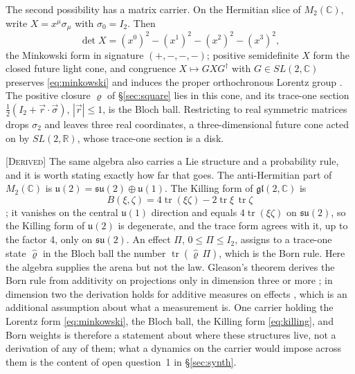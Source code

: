 \documentclass[11pt]{article}
\theoremstyle{boldplain}
\theoremstyle{boldupright}
\newcommand{\derived}{[\textup{\textsc{Derived}}]}
\newcommand{\tr}{\operatorname{tr}}
\begin{document}
The second possibility has a matrix carrier. On the Hermitian slice of $M_2(\mathbb{C})$, write $X=x^\mu\sigma_\mu$
with $\sigma_0=I_2$. Then
\begin{equation}\label{eq:minkowski}
\det X=(x^0)^2-(x^1)^2-(x^2)^2-(x^3)^2,
\end{equation}
the Minkowski form in signature $(+,-,-,-)$; positive semidefinite $X$ form the closed future light
cone, and congruence $X\mapsto GXG^\dagger$ with $G\in SL(2,\mathbb{C})$ preserves \eqref{eq:minkowski} and induces the proper
orthochronous Lorentz group \cite{penrose1984}. The positive closure $\varrho$ of \S\ref{sec:square} lies in this cone, and its trace-one
section $\tfrac12(I_2+\vec r\cdot\vec\sigma)$, $|\vec r|\le1$, is the Bloch ball. Restricting to real symmetric matrices drops $\sigma_2$ and
leaves three real coordinates, a three-dimensional future cone acted on by $SL(2,\mathbb{R})$, whose trace-one
section is a disk.

\derived{} The same algebra also carries a Lie structure and a probability rule, and it is worth stating
exactly how far that goes. The anti-Hermitian part of $M_2(\mathbb{C})$ is $\mathfrak{u}(2)=\mathfrak{su}(2)\oplus\mathfrak{u}(1)$. The Killing
form of $\mathfrak{gl}(2,\mathbb{C})$ is
\begin{equation}\label{eq:killing}
B(\xi,\zeta)=4\tr(\xi\zeta)-2\tr\xi\,\tr\zeta
\end{equation}
\cite{knapp2002}; it vanishes on the central $\mathfrak{u}(1)$ direction and equals $4\tr(\xi\zeta)$ on $\mathfrak{su}(2)$, so the Killing form
of $\mathfrak{u}(2)$ is degenerate, and the trace form agrees with it, up to the factor 4, only on $\mathfrak{su}(2)$. An effect
$\Pi$, $0\le\Pi\le I_2$, assigns to a trace-one state $\hat\varrho$ in the Bloch ball the number $\tr(\hat\varrho\,\Pi)$, which is the Born
rule. Here the algebra supplies the arena but not the law. Gleason's theorem derives the Born rule
from additivity on projections only in dimension three or more \cite{gleason1957}; in dimension two the derivation
holds for additive measures on effects \cite{busch2003}, which is an additional assumption about what a measurement
is. One carrier holding the Lorentz form \eqref{eq:minkowski}, the Bloch ball, the Killing form \eqref{eq:killing}, and Born weights
is therefore a statement about where these structures live, not a derivation of any of them; what a
dynamics on the carrier would impose across them is the content of open question~1 in \S\ref{sec:synth}.
\end{document}
